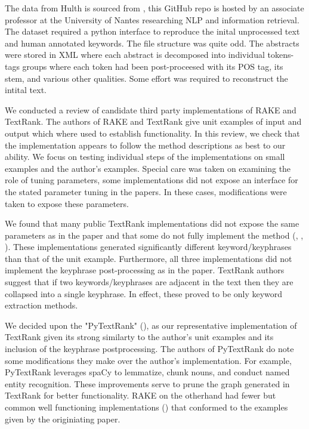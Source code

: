 \documentclass[11pt,a4paper]{article}
\begin{document}
The data from Hulth is sourced from \citet{Boudin}, this GitHub repo is hosted by an associate professor at the University of Nantes researching NLP and information retrieval. The dataset required a python interface to reproduce the inital unprocessed text and human annotated keywords. The file structure was quite odd. The abstracts were stored in XML where each abstract is decomposed into individual tokens-tags groups where each token had been post-proceesed with its POS tag, its stem, and various other qualities. Some effort was required to reconstruct the intital text.

We conducted a review of candidate third party implementations of RAKE and TextRank. The authors of RAKE and TextRank give unit examples of input and output which where used to establish functionality. In this review, we check that the implementation appears to follow the method descriptions as best to our ability. We focus on testing individual steps of the implementations on small examples and the author's examples. Special care was taken on examining the role of tuning parameters, some implementations did not expose an interface for the stated parameter tuning in the papers. In these cases, modifications were taken to expose these parameters.

We found that many public TextRank implementations did not expose the same parameters as in the paper and that some do not fully implement the method (\citet{TextRank-alt1}, \citet{TextRank-alt2}, \citet{TextRank-alt3}). These implementations generated significantly different keyword/keyphrases than that of the unit example. Furthermore, all three implementations did not implement the keyphrase post-processing as in the paper. TextRank authors suggest that if two keywords/keyphrases are adjacent in the text then they are collapsed into a single keyphrase. In effect, these proved to be only keyword extraction methods. 

We decided upon the "PyTextRank" (\citet{PyTextRank}), as our representative implementation of TextRank given its strong similarty to the author's unit examples and its inclusion of the keyphrase postprocessing. The authors of PyTextRank do note some modifications they make over the author's implementation. For example, PyTextRank leverages spaCy to lemmatize, chunk nouns, and conduct named entity recognition. These improvements serve to prune the graph generated in TextRank for better functionality. RAKE on the otherhand had fewer but common well functioning implementations (\citet{2}) that conformed to the examples given by the originiating paper. 
\end{document}
